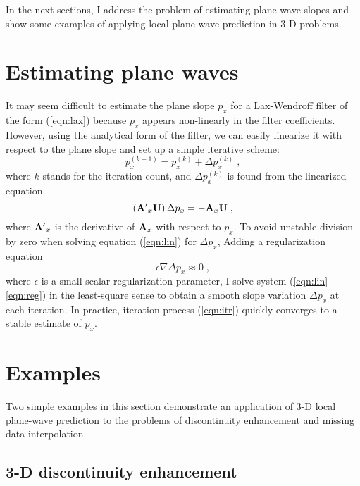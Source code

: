 \par
In the next sections, I address the problem of estimating plane-wave
slopes and show some examples of applying local plane-wave prediction
in 3-D problems.

\section{Estimating plane waves}

It may seem difficult to estimate the plane slope $p_x$ for a
Lax-Wendroff filter of the form (\ref{eqn:lax}) because $p_x$ appears
non-linearly in the filter coefficients. However, using the analytical
form of the filter, we can easily linearize it with respect to the
plane slope and set up a simple iterative scheme: 
\begin{equation}
  \label{eqn:itr}
  p_x^{(k+1)} = p_x^{(k)} + \Delta  p_x^{(k)}\;,
\end{equation}
where $k$ stands for the iteration count, and  $\Delta  p_x^{(k)}$ is found
from the linearized equation
\begin{equation}
  \label{eqn:lin}
\left(\bold{A'}_x \bold{U}\right) \Delta  p_x = - 
\bold{A}_x \bold{U}\;,
\end{equation}
where $\bold{A'}_x$ is the derivative of $\bold{A}_x$ with respect to
$p_x$. To avoid unstable division by zero when solving equation
(\ref{eqn:lin}) for $\Delta p_x$, Adding a regularization equation
\begin{equation}
  \label{eqn:reg}
\epsilon \nabla \Delta  p_x \approx 0\;,
\end{equation}
where $\epsilon$ is a small scalar regularization parameter, I solve
system (\ref{eqn:lin}-\ref{eqn:reg}) in the least-square sense to
obtain a smooth slope variation $\Delta p_x$ at each iteration.  In
practice, iteration process (\ref{eqn:itr}) quickly converges to a
stable estimate of $p_x$.
\section{Examples}
Two simple examples in this section demonstrate an application of 3-D
local plane-wave prediction to the problems of discontinuity
enhancement and missing data interpolation.

\subsection{3-D discontinuity enhancement}

